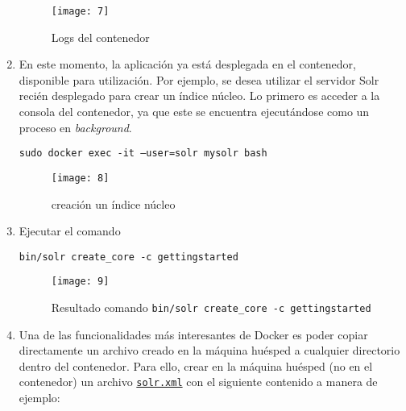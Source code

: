 \documentclass[10pt]{article}   			%
\begin{document}
\begin{enumerate}
\begin{figure}[ht]
	\centering
	\texttt{[image: 7]}   
	\caption{Logs del contenedor} 
\end{figure}
		
	\item 	En este momento, la aplicación ya está desplegada en el contenedor, disponible para utilización.  Por ejemplo, se desea utilizar el servidor Solr recién desplegado para crear un índice núcleo.  Lo primero es acceder a la consola del contenedor, ya que este se encuentra ejecutándose como un proceso en \textit{background}. 
	\begin{center}
		\texttt{sudo docker exec -it --user=solr mysolr bash}
	\end{center}
	\begin{figure}[ht]
		\centering
		\texttt{[image: 8]}   
		\caption{creación un índice núcleo} 
	\end{figure}		
	
	\newpage
	
	
	\item Ejecutar el comando
	\begin{center}
		\texttt{bin/solr create\_core -c gettingstarted}
	\end{center}
	\begin{figure}[H]
		\centering
		\texttt{[image: 9]}   
		\caption{Resultado comando \texttt{bin/solr create\_core -c gettingstarted}} 
	\end{figure}



\newpage	
	\item 	 Una de las funcionalidades más interesantes de Docker es poder copiar directamente un archivo creado en la máquina huésped a cualquier directorio dentro del contenedor. Para ello, crear en la máquina huésped (no en el contenedor) un archivo \texttt{\href{https://github.com/wilrilo/talleres/blob/master/file/taller6/solr.xml}{solr.xml}} con el siguiente contenido a manera de ejemplo:
	
	
	

\end{enumerate}
\end{document}
